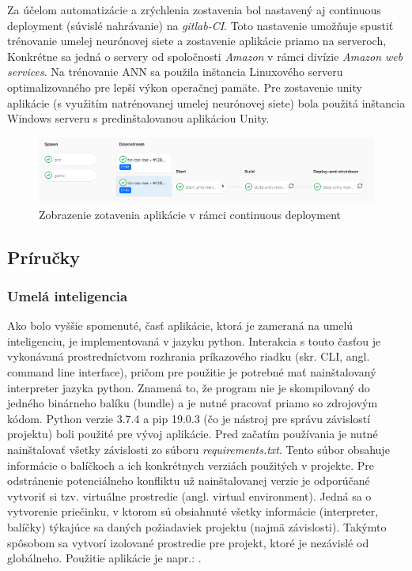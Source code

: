 Za účelom automatizácie a zrýchlenia zostavenia bol nastavený aj continuous deployment (súvislé nahrávanie) na
\emph{gitlab-CI}.
Toto nastavenie umožňuje spustiť trénovanie umelej neurónovej siete a zostavenie aplikácie priamo na serveroch,
Konkrétne sa jedná o servery od spoločnosti \emph{Amazon} v rámci divízie \emph{Amazon web services}.
Na trénovanie ANN sa použila inštancia Linuxového serveru optimalizovaného pre lepší výkon operačnej pamäte.
Pre zostavenie unity aplikácie (s využitím natrénovanej umelej neurónovej siete) bola použitá inštancia Windows
serveru s predinštalovanou aplikáciou Unity.
\begin{figure}[H]
    \centering
    \includegraphics[width=1\textwidth]{images/impl-cd.png}
    \caption{Zobrazenie zotavenia aplikácie v rámci continuous deployment}
\end{figure}\label{figure:cd}

\subsection{Príručky}\label{subsec:helpers}
\subsubsection{Umelá inteligencia}
Ako bolo vyššie spomenuté, časť aplikácie, ktorá je zameraná na umelú inteligenciu, je implementovaná v jazyku python.
Interakcia s touto časťou je vykonávaná prostredníctvom rozhrania príkazového riadku (skr. CLI, angl. command line
interface), pričom pre použitie je potrebné mať nainštalovaný interpreter jazyka python.
Znamená to, že program nie je skompilovaný do jedného binárneho balíku (bundle) a je nutné pracovať priamo so zdrojovým
kódom.
Python verzie 3.7.4 a pip 19.0.3 (čo je nástroj pre správu závislostí projektu) boli použité pre vývoj aplikácie.
Pred začatím používania je nutné nainštalovať všetky závislosti zo súboru \emph{requirements.txt}.
Tento súbor obsahuje informácie o balíčkoch a ich konkrétnych verziách použitých v projekte.
Pre odstránenie potenciálneho konfliktu už nainštalovanej verzie je odporúčané vytvoriť si tzv. virtuálne prostredie
(angl. virtual environment).
Jedná sa o vytvorenie priečinku, v ktorom sú obsiahnuté všetky informácie (interpreter, balíčky) týkajúce sa daných
požiadaviek projektu (najmä závislosti).
Takýmto spôsobom sa vytvorí izolované prostredie pre projekt, ktoré je nezávislé od globálneho.
Použitie aplikácie je napr.: .

